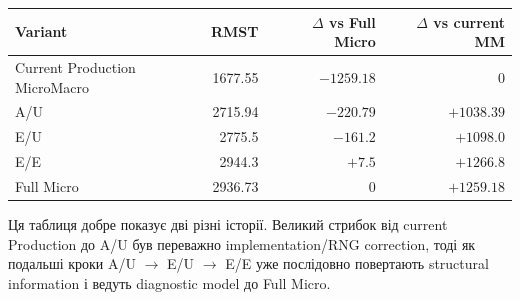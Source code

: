 \documentclass[11pt,a4paper]{article}
\begin{document}
\begin{center}
\begin{tabular}{l r r r}
\toprule
\textbf{Variant} & \textbf{RMST} & \textbf{$\Delta$ vs Full Micro} & \textbf{$\Delta$ vs current MM}\\
\midrule
Current Production MicroMacro & 1677.55 & $-1259.18$ & 0\\
A/U & 2715.94 & $-220.79$ & $+1038.39$\\
E/U & 2775.5 & $-161.2$ & $+1098.0$\\
E/E & 2944.3 & $+7.5$ & $+1266.8$\\
Full Micro & 2936.73 & 0 & $+1259.18$\\
\bottomrule
\end{tabular}
\end{center}

Ця таблиця добре показує дві різні історії. Великий стрибок від current Production до A/U був переважно implementation/RNG correction, тоді як подальші кроки A/U $\to$ E/U $\to$ E/E уже послідовно повертають structural information і ведуть diagnostic model до Full Micro.
\end{document}
